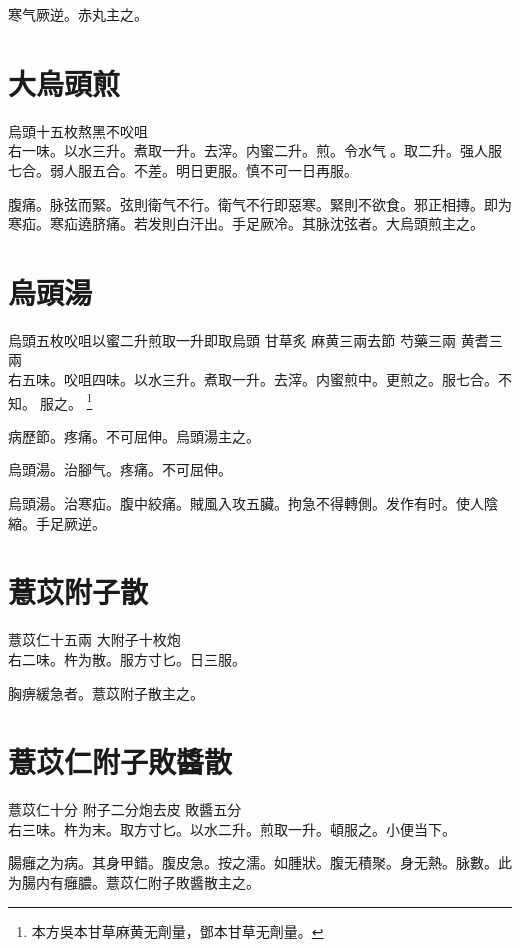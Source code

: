 寒气厥逆。赤丸主之。

\section{大烏頭煎}

烏頭{\scriptsize 十五枚熬黑不㕮咀}\\
右一味。以水三升。煮取一升。去滓。内蜜二升。煎。令水气{\sungtpii 𥁞}。取二升。强人服七合。弱人服五合。不差。明日更服。慎不可一日再服。

腹痛。脉弦而緊。弦則衛气不行。{\khaaitp 衛气不行}即惡寒。緊則不欲食。邪正相摶。即为寒疝。寒疝遶脐痛。若发則白汗出。手足厥冷。其脉沈弦者。大烏頭煎主之。

\section{烏頭湯}

烏頭{\scriptsize 五枚㕮咀以蜜二升煎取一升即取烏頭} 甘草{\scriptsize 炙} 麻黄{\scriptsize 三兩去節} 芍藥{\scriptsize 三兩} 黄耆{\scriptsize 三兩}\\
右五味。㕮咀四味。以水三升。煮取一升。去滓。内蜜煎中。更煎之。服七合。不知。{\sungtpii 𥁞}服之。
\footnote{本方吳本甘草麻黄无劑量，鄧本甘草无劑量。}

病歷節。疼痛。不可屈伸。烏頭湯主之。

烏頭湯。治腳气。疼痛。不可屈伸。

烏頭湯。治寒疝。腹中絞痛。賊風入攻五臟。拘急不得轉側。发作有时。使人陰縮。手足厥逆。

\section{薏苡附子散}

薏苡仁{\scriptsize 十五兩} 大附子{\scriptsize 十枚炮}\\
右二味。杵为散。服方寸匕。日三服。

胸痹緩急者。薏苡附子散主之。

\section{薏苡仁附子敗醬散}

薏苡仁{\scriptsize 十分} 附子{\scriptsize 二分炮去皮} 敗醬{\scriptsize 五分}\\
右三味。杵为末。取方寸匕。以水二升。煎取一升。頓服之。小便当下。

腸癰之为病。其身甲錯。腹皮急。按之濡。如腫狀。腹无積聚。身无熱。脉數。此为腸内有{\khaaitp 癰}膿。薏苡{\khaaitp 仁}附子敗醬散主之。

